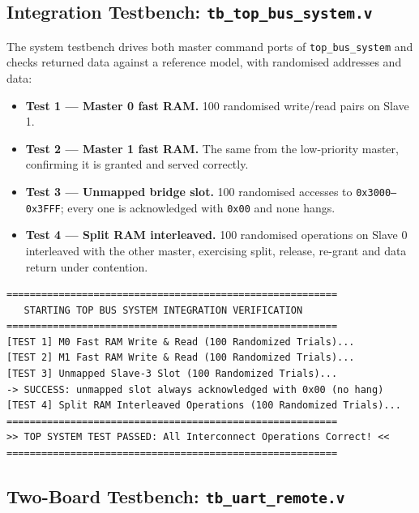 \documentclass[11pt,a4paper]{article}
\newcommand{\sig}[1]{\texttt{#1}}
\begin{document}
\subsection{Integration Testbench: \sig{tb\_top\_bus\_system.v}}

The system testbench drives both master command ports of \sig{top\_bus\_system}
and checks returned data against a reference model, with randomised addresses
and data:

\begin{itemize}
    \item \textbf{Test 1 --- Master 0 fast RAM.} 100 randomised write/read
          pairs on Slave 1.
    \item \textbf{Test 2 --- Master 1 fast RAM.} The same from the low-priority
          master, confirming it is granted and served correctly.
    \item \textbf{Test 3 --- Unmapped bridge slot.} 100 randomised accesses to
          \texttt{0x3000--0x3FFF}; every one is acknowledged with \sig{0x00} and
          none hangs.
    \item \textbf{Test 4 --- Split RAM interleaved.} 100 randomised operations
          on Slave 0 interleaved with the other master, exercising split,
          release, re-grant and data return under contention.
\end{itemize}

\begin{lstlisting}[numbers=none, basicstyle=\ttfamily\scriptsize,
                   caption={\sig{tb\_top\_bus\_system.v} console output}]
=========================================================
   STARTING TOP BUS SYSTEM INTEGRATION VERIFICATION
=========================================================
[TEST 1] M0 Fast RAM Write & Read (100 Randomized Trials)...
[TEST 2] M1 Fast RAM Write & Read (100 Randomized Trials)...
[TEST 3] Unmapped Slave-3 Slot (100 Randomized Trials)...
-> SUCCESS: unmapped slot always acknowledged with 0x00 (no hang)
[TEST 4] Split RAM Interleaved Operations (100 Randomized Trials)...
=========================================================
>> TOP SYSTEM TEST PASSED: All Interconnect Operations Correct! <<
=========================================================
\end{lstlisting}

\subsection{Two-Board Testbench: \sig{tb\_uart\_remote.v}}
\end{document}

